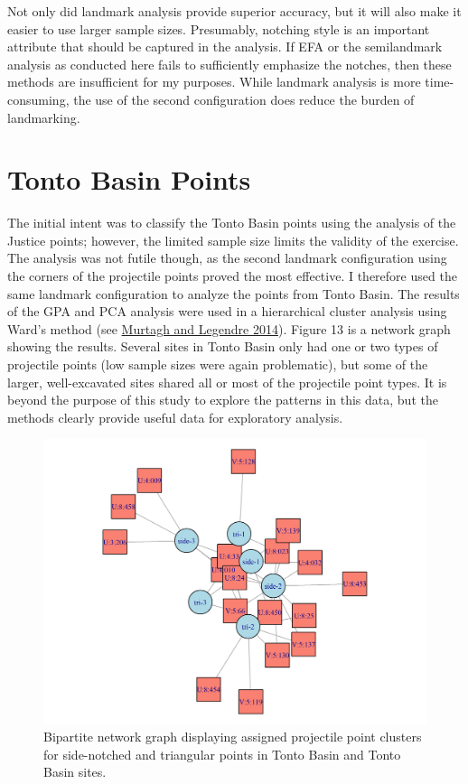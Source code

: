 \documentclass{article}
\begin{document}
Not only did landmark analysis provide superior accuracy, but it will
also make it easier to use larger sample sizes. Presumably, notching
style is an important attribute that should be captured in the analysis.
If EFA or the semilandmark analysis as conducted here fails to
sufficiently emphasize the notches, then these methods are insufficient
for my purposes. While landmark analysis is more time-consuming, the use
of the second configuration does reduce the burden of landmarking.

\hypertarget{tonto-basin-points}{%
\section{Tonto Basin Points}\label{tonto-basin-points}}

The initial intent was to classify the Tonto Basin points using the
analysis of the Justice points; however, the limited sample size limits
the validity of the exercise. The analysis was not futile though, as the
second landmark configuration using the corners of the projectile points
proved the most effective. I therefore used the same landmark
configuration to analyze the points from Tonto Basin. The results of the
GPA and PCA analysis were used in a hierarchical cluster analysis using
Ward's method (see \protect\hyperlink{ref-Murtagh2014-mb}{Murtagh and
Legendre 2014}). Figure 13 is a network graph showing the results.
Several sites in Tonto Basin only had one or two types of projectile
points (low sample sizes were again problematic), but some of the
larger, well-excavated sites shared all or most of the projectile point
types. It is beyond the purpose of this study to explore the patterns in
this data, but the methods clearly provide useful data for exploratory
analysis.

\begin{figure}
\includegraphics[width=1\linewidth]{figures/TontoClusterNetwork} \caption{Bipartite network graph displaying assigned projectile point clusters for side-notched and triangular points in Tonto Basin and Tonto Basin sites.}\label{fig:TontoClusterNetwork}
\end{figure}
\end{document}
